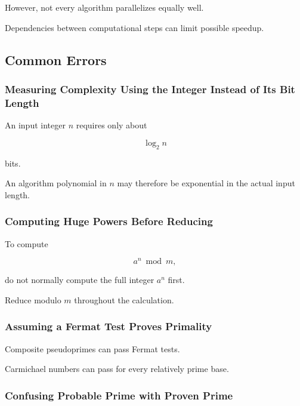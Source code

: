 However, not every algorithm parallelizes equally well.

Dependencies between computational steps can limit possible speedup.

\subsection{Common Errors}
\label{subsec:computational-number-theory-common-errors}

\subsubsection{Measuring Complexity Using the Integer Instead of Its Bit Length}

An input integer \(n\) requires only about

\[ \log_2 n \]

bits.

An algorithm polynomial in \(n\) may therefore be exponential in the actual
input length.

\subsubsection{Computing Huge Powers Before Reducing}

To compute

\[ a^n\bmod m, \]

do not normally compute the full integer \(a^n\) first.

Reduce modulo \(m\) throughout the calculation.

\subsubsection{Assuming a Fermat Test Proves Primality}

Composite pseudoprimes can pass Fermat tests.

Carmichael numbers can pass for every relatively prime base.

\subsubsection{Confusing Probable Prime with Proven Prime}

